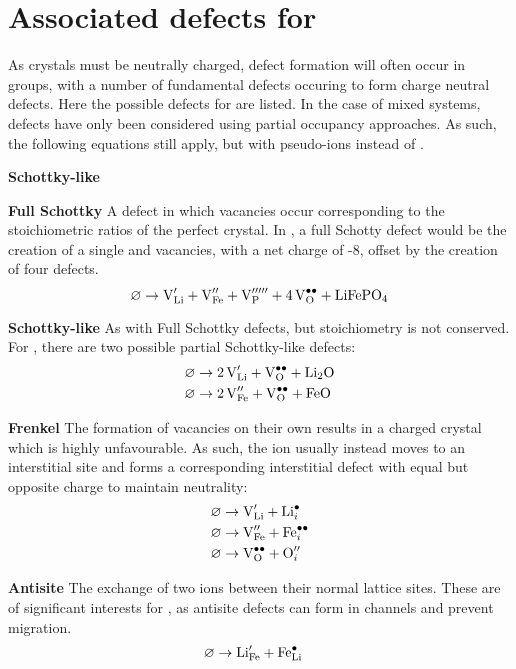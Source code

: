 \newpage
\section{Associated defects for }
As crystals must be neutrally charged, defect formation will often occur in groups, with a number of fundamental defects occuring to form charge neutral defects. Here the possible defects for  are listed.
In the case of mixed systems, defects have only been considered using partial occupancy approaches.
As such, the following equations still apply, but with pseudo-ions instead of .

\begin{labeling}{\textbf{Schottky-like}}
\item[\textbf{Full Schottky}] A defect in which vacancies occur corresponding to the stoichiometric ratios of the perfect crystal. In , a full Schotty defect would be the creation of a single  and  vacancies, with a net charge of -8, offset by the creation of four  defects.
\begin{equation}
\varnothing \rightarrow \ce{V^\prime_{Li} +  V^{\prime \prime}_{Fe} + V^{\prime \prime \prime \prime \prime}_{P} + 4V^{\bullet \bullet}_{O} + LiFePO4}
\end{equation}
\item[\textbf{Schottky-like}] As with Full Schottky defects, but stoichiometry is not conserved.
For , there are two possible partial Schottky-like defects:
\begin{align}
\varnothing &\rightarrow \ce{2V^\prime_{Li} + V^{\bullet \bullet}_{O} + Li2O} \\
\varnothing &\rightarrow \ce{2V^{\prime \prime}_{Fe} + V^{\bullet \bullet}_{O} + FeO}
\end{align}
\item[\textbf{Frenkel}] The formation of vacancies on their own results in a charged crystal which is highly unfavourable. As such, the ion usually instead moves to an interstitial site and forms a corresponding interstitial defect with equal but opposite charge to maintain neutrality:
\begin{align}
\varnothing &\rightarrow \ce{V^\prime_{Li} +  Li^{\bullet}_{i}}\\
\varnothing &\rightarrow \ce{V^{\prime \prime}_{Fe} +  Fe^{\bullet\bullet}_{i}}\\
\varnothing &\rightarrow \ce{V^{\bullet\bullet}_{O} +  O^{\prime \prime}_{i}}
\end{align}
\item[\textbf{Antisite}] The exchange of two ions between their normal lattice sites. These are of significant interests for , as  antisite defects can form in  channels and prevent  migration.
\begin{align}
\varnothing &\rightarrow \ce{Li^\prime_{Fe} +  Fe^{\bullet}_{Li}}
\end{align}
\end{labeling}
